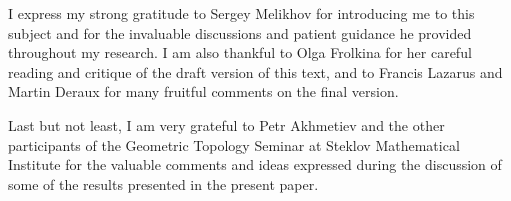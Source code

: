 \documentclass[a4paper,12pt,reqno,oneside]{amsart}
\theoremstyle{plain}
\theoremstyle{definition}
\theoremstyle{plain}
\begin{document}
I express my strong gratitude to Sergey Melikhov for introducing me to this subject and for the
invaluable discussions and patient guidance he provided throughout my research. I am also thankful
to Olga Frolkina for her careful reading and critique of the draft version of this text, and to
Francis Lazarus and Martin Deraux for many fruitful comments on the final version.

Last but not least, I am very grateful to Petr Akhmetiev and the other participants of the Geometric
Topology Seminar at Steklov Mathematical Institute for the valuable comments and ideas expressed
during the discussion of some of the results presented in the present paper.



\end{document}
